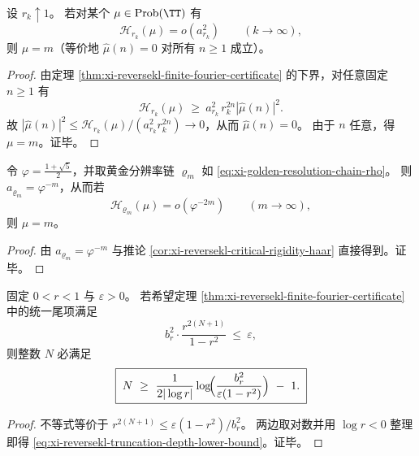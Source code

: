 \begin{corollary}\label{cor:xi-reversekl-critical-rigidity-haar}
设 \(r_k\uparrow 1\)。
若对某个 \(\mu\in\mathrm{Prob}(\TT)\) 有
\[
\mathcal H_{r_k}(\mu)=o\!\left(a_{r_k}^2\right)\qquad(k\to\infty),
\]
则 \(\mu=m\)（等价地 \(\widehat\mu(n)=0\) 对所有 \(n\ge 1\) 成立）。
\end{corollary}
\begin{proof}
由定理 \ref{thm:xi-reversekl-finite-fourier-certificate} 的下界，对任意固定 \(n\ge 1\) 有
\[
\mathcal H_{r_k}(\mu)\ \ge\ a_{r_k}^2\,r_k^{2n}|\widehat\mu(n)|^2.
\]
故
\(
|\widehat\mu(n)|^2\le \mathcal H_{r_k}(\mu)/(a_{r_k}^2 r_k^{2n})\to 0
\)，从而 \(\widehat\mu(n)=0\)。
由于 \(n\) 任意，得 \(\mu=m\)。证毕。
\end{proof}

\begin{corollary}[黄金分辨率链上的临界尺度]\label{cor:xi-golden-chain-reversekl-critical}
令 \(\varphi=\frac{1+\sqrt5}{2}\)，并取黄金分辨率链 \(\varrho_m\) 如 \eqref{eq:xi-golden-resolution-chain-rho}。
则 \(a_{\varrho_m}=\varphi^{-m}\)，从而若
\[
\mathcal H_{\varrho_m}(\mu)=o(\varphi^{-2m})\qquad(m\to\infty),
\]
则 \(\mu=m\)。
\end{corollary}
\begin{proof}
由 \(a_{\varrho_m}=\varphi^{-m}\) 与推论 \ref{cor:xi-reversekl-critical-rigidity-haar} 直接得到。证毕。
\end{proof}

\begin{proposition}[统一尾项预算的截断阶下界]\label{prop:xi-reversekl-truncation-depth-lower-bound}
固定 \(0<r<1\) 与 \(\varepsilon>0\)。
若希望定理 \ref{thm:xi-reversekl-finite-fourier-certificate} 中的统一尾项满足
\[
b_r^2\cdot \frac{r^{2(N+1)}}{1-r^2}\ \le\ \varepsilon,
\]
则整数 \(N\) 必满足
\begin{equation}\label{eq:xi-reversekl-truncation-depth-lower-bound}
\boxed{\;
N\ \ge\ \frac{1}{2|\log r|}\log\!\Bigl(\frac{b_r^2}{\varepsilon(1-r^2)}\Bigr)\ -\ 1.\;}
\end{equation}
\end{proposition}
\begin{proof}
不等式等价于 \(r^{2(N+1)}\le \varepsilon(1-r^2)/b_r^2\)。
两边取对数并用 \(\log r<0\) 整理即得 \eqref{eq:xi-reversekl-truncation-depth-lower-bound}。证毕。
\end{proof}

